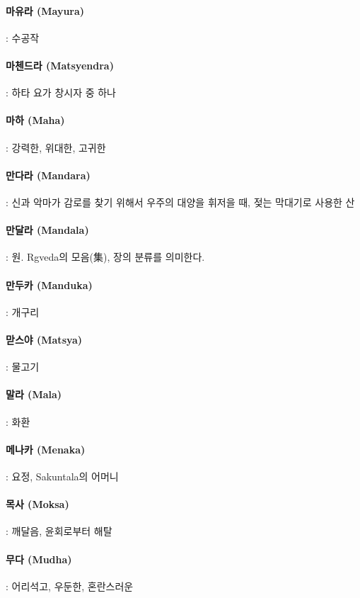 \documentclass[12pt, a4paper, oneside]{book}
\begin{document}
\paragraph{마유라 (Mayura)} : 수공작

\paragraph{마첸드라 (Matsyendra)} : 하타 요가 창시자 중 하나

\paragraph{마하 (Maha)} : 강력한, 위대한, 고귀한

\paragraph{만다라 (Mandara)} : 신과 악마가 감로를 찾기 위해서 우주의 대양을 휘저을 때, 젖는 막대기로 사용한 산

\paragraph{만달라 (Mandala)} : 원. Rgveda의 모음(集), 장의 분류를 의미한다.

\paragraph{만두카 (Manduka)} : 개구리

\paragraph{맏스야 (Matsya)} : 물고기

\paragraph{말라 (Mala)} : 화환

\paragraph{메나카 (Menaka)} : 요정, Sakuntala의 어머니

\paragraph{목사 (Moksa)} : 깨달음, 윤회로부터 해탈

\paragraph{무다 (Mudha)} : 어리석고, 우둔한, 혼란스러운
\end{document}
